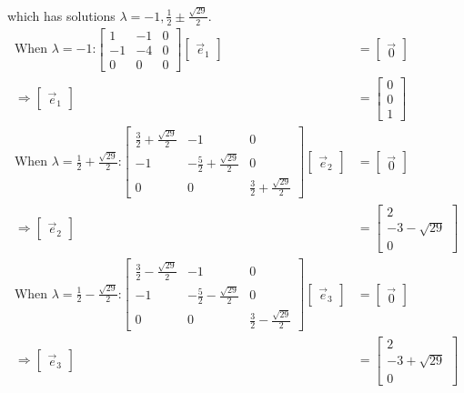 \documentclass[11pt]{homework}
\begin{document}
which has solutions $\lambda = -1, \frac{1}{2} \pm \frac{\sqrt{29}}{2}$.
\begin{align*}
\text{When $\lambda = -1$:}
  \begin{bmatrix}
  1 & -1 & 0 \\
  -1  & -4 & 0 \\
  0  & 0 & 0
  \end{bmatrix} 
  \begin{bmatrix}
  \vec e_1
  \end{bmatrix}
  &= 
  \begin{bmatrix}
  \vec 0
  \end{bmatrix} \\
\Rightarrow
  \begin{bmatrix}
  \vec e_1
  \end{bmatrix}
  &= 
  \begin{bmatrix}
  0 \\
  0 \\
  1
  \end{bmatrix} \\
\text{When $\lambda = \frac{1}{2} + \frac{\sqrt{29}}{2}$:}
  \begin{bmatrix}
  \frac{3}{2}+\frac{\sqrt{29}}{2} & -1 & 0 \\
  -1  & -\frac{5}{2} + \frac{\sqrt{29}}{2} & 0 \\
  0  & 0 & \frac{3}{2}+\frac{\sqrt{29}}{2}
  \end{bmatrix} 
  \begin{bmatrix}
  \vec e_2
  \end{bmatrix}
  &= 
  \begin{bmatrix}
  \vec 0
  \end{bmatrix} \\
\Rightarrow
  \begin{bmatrix}
  \vec e_2
  \end{bmatrix}
  &= 
  \begin{bmatrix}
  2 \\
  -3 - \sqrt{29} \\
  0
  \end{bmatrix} \\
\text{When $\lambda = \frac{1}{2} - \frac{\sqrt{29}}{2}$:}
  \begin{bmatrix}
  \frac{3}{2}-\frac{\sqrt{29}}{2} & -1 & 0 \\
  -1  & -\frac{5}{2} - \frac{\sqrt{29}}{2} & 0 \\
  0  & 0 & \frac{3}{2}-\frac{\sqrt{29}}{2}
  \end{bmatrix} 
  \begin{bmatrix}
  \vec e_3
  \end{bmatrix}
  &= 
  \begin{bmatrix}
  \vec 0
  \end{bmatrix} \\
\Rightarrow
  \begin{bmatrix}
  \vec e_3
  \end{bmatrix}
  &= 
  \begin{bmatrix}
  2 \\
  -3 + \sqrt{29} \\
  0
  \end{bmatrix}
\end{align*}
\end{document}

